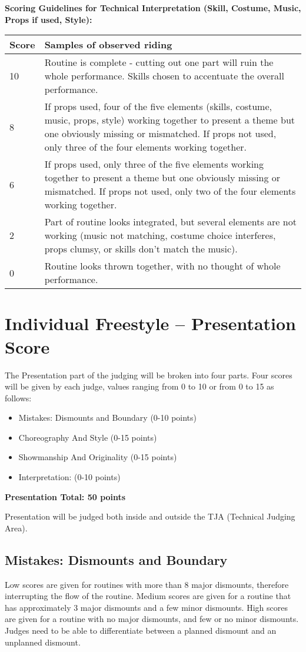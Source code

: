 \textbf{Scoring Guidelines for Technical Interpretation (Skill, Costume, Music, Props if used, Style):}

\begin{tabular}{|l|p{12.5cm}|}
\hline
\textbf{Score} & \textbf{Samples of observed riding}  \\
\hline
10 & Routine is complete - cutting out one part will ruin the whole performance.
Skills chosen to accentuate the overall performance. \\
\hline
8 & If props used, four of the five elements (skills, costume, music, props, style) working together to present a theme but one obviously missing or mismatched.
If props not used, only three of the four elements working together. \\
\hline
6 & If props used, only three of the five elements working together to present a theme but one obviously missing or mismatched.
If props not used, only two of the four elements working together. \\
\hline
2 & Part of routine looks integrated, but several elements are not working (music not matching, costume choice interferes, props clumsy, or skills don't match the music). \\
\hline
0 & Routine looks thrown together, with no thought of whole performance. \\
\hline
\end{tabular}

\section{Individual Freestyle – Presentation Score \label{sec:freestyle_individual-presentation-score}}
The Presentation part of the judging will be broken into four parts.
Four scores will be given by each judge, values ranging from 0 to 10 or from 0 to 15 as follows:
\begin{itemize}
\item Mistakes: Dismounts and Boundary (0-10 points) 
\item Choreography And Style (0-15 points) 
\item Showmanship And Originality (0-15 points) 
\item Interpretation: (0-10 points)
\end{itemize}
\textbf{Presentation Total: 50 points}

Presentation will be judged both inside and outside the TJA (Technical Judging Area).

\subsection{Mistakes: Dismounts and Boundary}
Low scores are given for routines with more than 8 major dismounts, therefore interrupting the flow of the routine.
Medium scores are given for a routine that has approximately 3 major dismounts and a few minor dismounts.
High scores are given for a routine with no major dismounts, and few or no minor dismounts.
Judges need to be able to differentiate between a planned dismount and an unplanned dismount.

